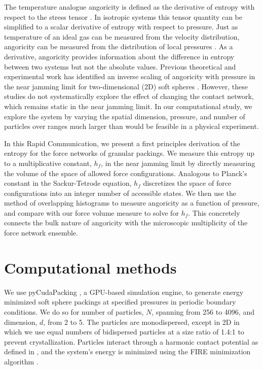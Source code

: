 The temperature analogue angoricity is defined as the derivative of entropy with respect to the stress tensor
\cite{edwards_distribution_2008}. In isotropic systems this tensor quantity can be simplified to a scalar derivative of entropy with respect to pressure. Just as temperature of an ideal gas can be measured from the velocity distribution, angoricity can be measured from the distribution of local pressures \cite{bililign_protocol_2019}. As a derivative, angoricity provides information about the difference in entropy between two systems but not the absolute values. Previous theoretical and experimental work has identified an inverse scaling of angoricity with pressure in the near jamming limit for two-dimensional (2D) soft spheres \cite{henkes_statistical_2009,bililign_protocol_2019}. However, these studies do not systematically explore the effect of changing the contact network, which remains static in the near jamming limit. In our computational study, we explore the system by varying the spatial dimension, pressure, and number of particles over ranges much larger than would be feasible in a physical experiment.

In this Rapid Communication, we present a first principles derivation of the entropy for the force networks of granular packings.  We measure this entropy up to a multiplicative constant, $h_f$, in the near jamming limit by directly measuring the volume of the space of allowed force configurations.  Analogous to Planck's constant in the Sackur-Tetrode equation, $h_f$ discretizes the space of force configurations into an integer number of accessible states.  We then use the method of overlapping histograms to measure angoricity as a function of pressure, and compare with our force volume measure to solve for $h_f$. This concretely connects the bulk nature of angoricity with the microscopic multiplicity of the force network ensemble.

 \section{Computational methods} We use pyCudaPacking \cite{charbonneau_universal_2012}, a GPU-based simulation engine, to generate energy minimized soft sphere packings at specified pressures in periodic boundary conditions. We do so for number of particles, $N$, spanning from 256 to 4096, and dimension, $d$, from 2 to 5. The particles are monodispersed, except in 2D in which we use equal numbers of bidispersed particles at a size ratio of 1.4:1 to prevent crystallization. Particles interact through a harmonic contact potential as defined in \cite{charbonneau_universal_2012}, and the system's energy is minimized using the FIRE minimization algorithm \cite{bitzek_structural_2006}.
 
